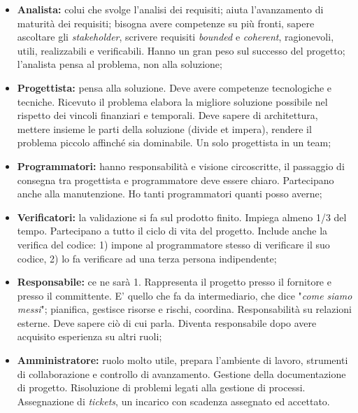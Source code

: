 \begin{itemize}

	\item \textbf{Analista:} colui che svolge l'analisi dei requisiti; aiuta l'avanzamento di maturità dei requisiti; bisogna avere competenze su più fronti, sapere ascoltare gli \textit{stakeholder}, scrivere requisiti \textit{bounded} e \textit{coherent}, ragionevoli, utili, realizzabili e verificabili. Hanno un gran peso sul successo del progetto; l'analista pensa al problema, non alla soluzione;
	
	\item \textbf{Progettista:} pensa alla soluzione. Deve avere competenze tecnologiche e tecniche. Ricevuto il problema elabora la migliore soluzione possibile nel rispetto dei vincoli finanziari e temporali. Deve sapere di architettura, mettere insieme le parti della soluzione (divide et impera), rendere il problema piccolo affinché sia dominabile. Un solo progettista in un team;
	
	\item \textbf{Programmatori:} hanno responsabilità e visione circoscritte, il passaggio di consegna tra progettista e programmatore deve essere chiaro. Partecipano anche alla manutenzione. Ho tanti programmatori quanti posso averne;
	
	\item \textbf{Verificatori:} la validazione si fa sul prodotto finito. Impiega almeno 1/3 del tempo. Partecipano a tutto il ciclo di vita del progetto. Include anche la verifica del codice: 1) impone al programmatore stesso di verificare il suo codice, 2) lo fa verificare ad una terza persona indipendente;
	
	\item \textbf{Responsabile:} ce ne sarà 1. Rappresenta il progetto presso il fornitore e presso il committente. E' quello che fa da intermediario, che dice "\textit{come siamo messi}"; pianifica, gestisce risorse e rischi, coordina. Responsabilità su relazioni esterne. Deve sapere ciò di cui parla. Diventa responsabile dopo avere acquisito esperienza su altri ruoli;
	
	\item \textbf{Amministratore:} ruolo molto utile, prepara l'ambiente di lavoro, strumenti di collaborazione e controllo di avanzamento. Gestione della documentazione di progetto. Risoluzione di problemi legati alla gestione di processi. Assegnazione di \textit{tickets}, un incarico con scadenza assegnato ed accettato.
\end{itemize}


